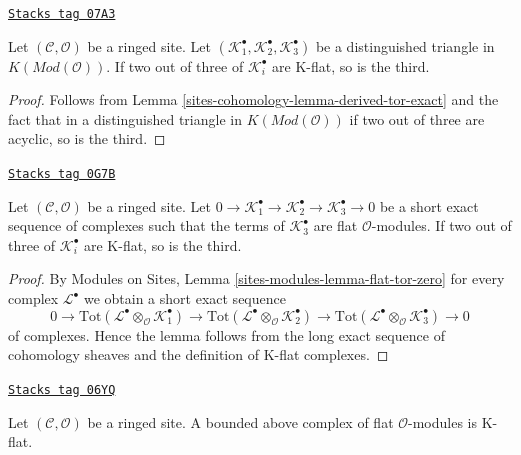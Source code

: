 \begin{lemma}
\label{sites-cohomology-lemma-K-flat-two-out-of-three}
\href{https://stacks.math.columbia.edu/tag/07A3}{\texttt{Stacks tag 07A3}}

Let $(\mathcal{C}, \mathcal{O})$ be a ringed site.
Let $(\mathcal{K}_1^\bullet, \mathcal{K}_2^\bullet, \mathcal{K}_3^\bullet)$
be a distinguished triangle in $K(\textit{Mod}(\mathcal{O}))$.
If two out of three of $\mathcal{K}_i^\bullet$ are K-flat, so is the third.
\end{lemma}

\begin{proof}
Follows from
Lemma \ref{sites-cohomology-lemma-derived-tor-exact}
and the fact that in a distinguished triangle in
$K(\textit{Mod}(\mathcal{O}))$
if two out of three are acyclic, so is the third.
\end{proof}

\begin{lemma}
\label{sites-cohomology-lemma-K-flat-two-out-of-three-ses}
\href{https://stacks.math.columbia.edu/tag/0G7B}{\texttt{Stacks tag 0G7B}}

Let $(\mathcal{C}, \mathcal{O})$ be a ringed site. Let
$0 \to \mathcal{K}_1^\bullet \to \mathcal{K}_2^\bullet \to
\mathcal{K}_3^\bullet \to 0$ be a short exact sequence of complexes
such that the terms of $\mathcal{K}_3^\bullet$ are flat $\mathcal{O}$-modules.
If two out of three of $\mathcal{K}_i^\bullet$ are K-flat, so is the third.
\end{lemma}

\begin{proof}
By Modules on Sites, Lemma \ref{sites-modules-lemma-flat-tor-zero}
for every complex $\mathcal{L}^\bullet$
we obtain a short exact sequence
$$
0 \to
\text{Tot}(\mathcal{L}^\bullet \otimes_\mathcal{O} \mathcal{K}_1^\bullet) \to
\text{Tot}(\mathcal{L}^\bullet \otimes_\mathcal{O} \mathcal{K}_2^\bullet) \to
\text{Tot}(\mathcal{L}^\bullet \otimes_\mathcal{O} \mathcal{K}_3^\bullet) \to 0
$$
of complexes. Hence the lemma follows from the long exact sequence of
cohomology sheaves and the definition of K-flat complexes.
\end{proof}

\begin{lemma}
\label{sites-cohomology-lemma-bounded-flat-K-flat}
\href{https://stacks.math.columbia.edu/tag/06YQ}{\texttt{Stacks tag 06YQ}}

Let $(\mathcal{C}, \mathcal{O})$ be a ringed site. A bounded above complex
of flat $\mathcal{O}$-modules is K-flat.
\end{lemma}

